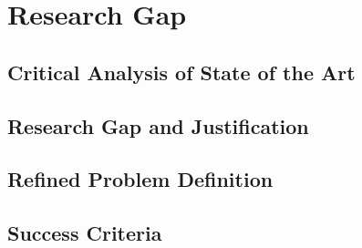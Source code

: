 \chapter{Research Gap}\label{ch:research_gap}


\section{Critical Analysis of State of the Art} %

\section{Research Gap and Justification} %

\section{Refined Problem Definition} %

\section{Success Criteria} %

